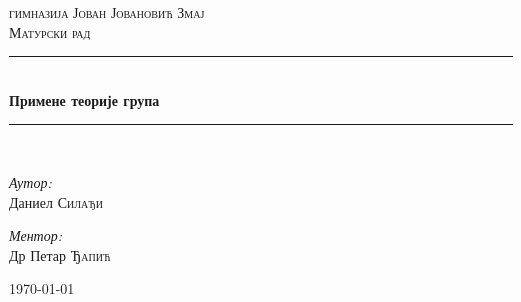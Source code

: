 \documentclass{report}
\theoremstyle{plain}
\theoremstyle{definition}
\newcommand{\HRule}{\rule{\linewidth}{0.5mm}}
\begin{document}
\begin{titlepage}
\begin{center}

\textsc{\LARGE гимназија Јован Јовановић Змај}\\[1.5cm]

\textsc{\Large Матурски рад}\\[0.5cm]

\HRule \\[0.4cm]
{ \huge \bfseries Примене теорије група \\[0.4cm] }

\HRule \\[1.5cm]

\begin{minipage}{0.4\textwidth}
\begin{flushleft} \large
\emph{Аутор:}\\
Даниел \textsc{Силађи}
\end{flushleft}
\end{minipage}
\begin{minipage}{0.4\textwidth}
\begin{flushright} \large
\emph{Ментор:} \\
Др Петар \textsc{Ђапић}
\end{flushright}
\end{minipage}

\vfill

{\large \today}

\end{center}
\end{titlepage}

\setcounter{tocdepth}{1}
\tableofcontents
\end{document}

